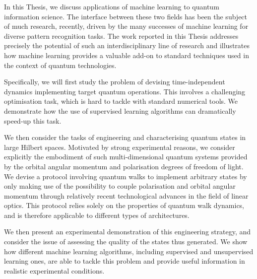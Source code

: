 In this Thesis, we discuss applications of machine learning to quantum information science.
The interface between these two fields has been the subject of much research, recently, driven by the many successes of machine learning for diverse pattern recognition tasks. The work reported in this Thesis addresses precisely the potential of such an interdisciplinary line of research and illustrates how machine learning provides a valuable add-on to standard techniques used in the context of quantum technologies.

Specifically, we will first study the problem of devising time-independent dynamics implementing target quantum operations.
This involves a challenging optimisation task, which is hard to tackle with standard numerical tools.
We demonstrate how the use of supervised learning algorithms can dramatically speed-up this task.

We then consider the tasks of engineering and characterising quantum states in large Hilbert spaces. Motivated by strong experimental reasons, we consider explicitly the embodiment of such multi-dimensional quantum systems provided by the orbital angular momentum and polarisation degrees of freedom of light.
We devise a protocol involving quantum walks to implement arbitrary states by only making use of the possibility to couple polarisation and orbital angular momentum through relatively recent technological advances in the field of linear optics.
This protocol relies solely on the properties of quantum walk dynamics, and is therefore applicable to different types of architectures.

We then present an experimental demonstration of this engineering strategy, and consider the issue of assessing the quality of the states thus generated.
We show how different machine learning algorithms, including supervised and unsupervised learning ones, are able to tackle this problem and provide useful information in realistic experimental conditions.



\clearpage


\tableofcontents



\clearpage

